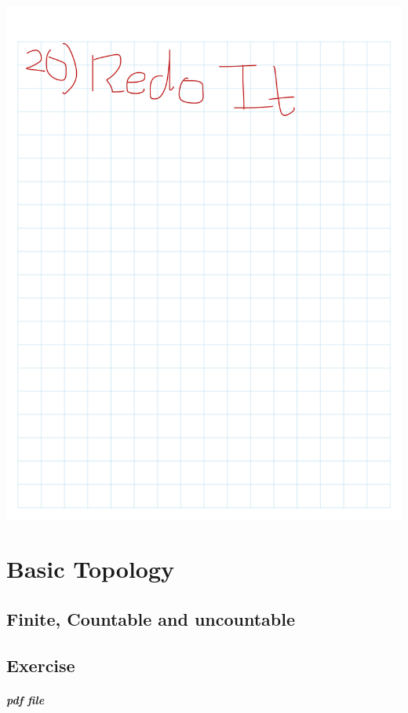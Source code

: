 \documentclass[
]{book}
\theoremstyle{definition}
\theoremstyle{definition}
\theoremstyle{definition}
\theoremstyle{definition}
\theoremstyle{remark}
\begin{document}
\includegraphics{Figures/Ex-1/Rudin-Ex (35).png}

\chapter{Basic Topology}\label{basic-topology}

\section{Finite, Countable and uncountable}\label{finite-countable-and-uncountable}

\section{Exercise}\label{exercise-1}

\paragraph{pdf file}\label{pdf-file-1}
\end{document}
